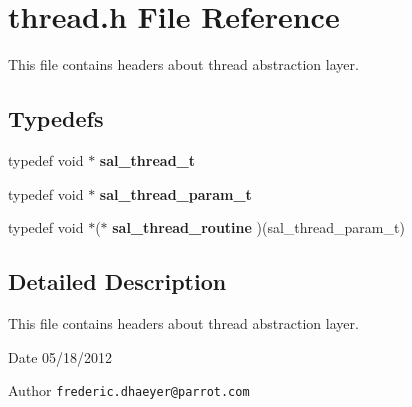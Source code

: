 \section{thread.h File Reference}
\label{thread_8h}


This file contains headers about thread abstraction layer.  


\subsection*{Typedefs}
\begin{DoxyCompactItemize}
\item 
typedef void $\ast$ {\bfseries sal\_\-thread\_\-t}\label{thread_8h_a0e586c8fa470863d8cb2fc0796df3bd0}

\item 
typedef void $\ast$ {\bfseries sal\_\-thread\_\-param\_\-t}\label{thread_8h_abede0e14e149c3fa1b0539b371d06d9b}

\item 
typedef void $\ast$($\ast$ {\bfseries sal\_\-thread\_\-routine} )(sal\_\-thread\_\-param\_\-t)\label{thread_8h_a68aa11e7b0505f27ba84bbe3857b08b6}

\end{DoxyCompactItemize}


\subsection{Detailed Description}
This file contains headers about thread abstraction layer. \begin{DoxyDate}{Date}
05/18/2012 
\end{DoxyDate}
\begin{DoxyAuthor}{Author}
{\tt frederic.dhaeyer@parrot.com} 
\end{DoxyAuthor}

